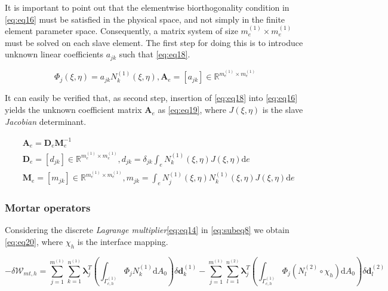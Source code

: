 \documentclass[a4paper,10pt]{article} %
\begin{document}
It is important to point out that the elementwise biorthogonality condition in \eqref{eq:eq16} must be satisfied in the physical space, and not simply in the finite element parameter space. Consequently, a matrix system of size $m_e^{(1)} \times m_e^{(1)}$ must be solved on each slave element. The first step for doing this is to introduce unknown linear coefficients $a_{jk}$ such that \eqref{eq:eq18}.

\begin{equation}\label{eq:eq18}
    \Phi_j(\xi, \eta) = a_{jk} N_k^{(1)}\left(\xi, \eta \right), \mathbf{A}_e = [a_{jk}] \in \mathbb{R}^{m_e^{(1)} \times m_e^{(1)}}
\end{equation}
 
 It can easily be verified that, as second step, insertion of \eqref{eq:eq18} into \eqref{eq:eq16} yields the unknown
coefficient matrix $\mathbf{A}_e$ as \eqref{eq:eq19}, where $J(\xi, \eta)$ is the slave \textit{Jacobian} determinant.

\begin{equation}\label{eq:eq19}
    \begin{aligned}
        & \mathbf{A}_e = \mathbf{D}_e\mathbf{M}_e^{-1} \\
        & \mathbf{D}_e = [d_{jk}] \in \mathbb{R}^{m_e^{(1)} \times m_e^{(1)}}, d_{jk} = \delta_{jk} \int_e N_k^{(1)}(\xi, \eta) J(\xi, \eta) \text{d}e \\
        & \mathbf{M}_e = [m_{jk}] \in \mathbb{R}^{m_e^{(1)} \times m_e^{(1)}}, m_{jk} = \int_e N_j^{(1)}(\xi, \eta) N_k^{(1)}(\xi, \eta) J(\xi, \eta) \text{d}e
    \end{aligned}
\end{equation}

\subsubsection{Mortar operators}

Considering the discrete \textit{Lagrange multiplier}\eqref{eq:eq14} in \eqref{eq:subeq8} we obtain \eqref{eq:eq20}, where $\chi_h$ is the interface mapping.

\begin{equation}\label{eq:eq20}
    -\delta \mathcal{W}_{mt,h} = \sum_{j=1}^{m^{(1)}}\sum_{k=1}^{n^{(1)}} \boldsymbol{\lambda}_j^T \left(\int_{\Gamma_{c,h}^{(1)}} \Phi_j N_k^{(1)} \text{d}A_0 \right) \delta \mathbf{d}_k^{(1)} -\sum_{j=1}^{m^{(1)}}\sum_{l=1}^{n^{(2)}} \boldsymbol{\lambda}_j^T \left(\int_{\Gamma_{c,h}^{(1)}} \Phi_j \left(N_l^{(2)} \circ \chi_h\right) \text{d}A_0 \right) \delta \mathbf{d}_l^{(2)}
\end{equation}
\end{document}

